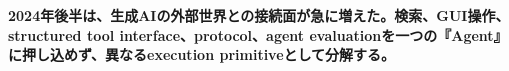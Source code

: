 \noindent\textbf{2024年後半は、生成AIの外部世界との接続面が急に増えた。検索、GUI操作、structured tool interface、protocol、agent evaluationを一つの『Agent』に押し込めず、異なるexecution primitiveとして分解する。}\autocite{src-6cafd8cf5668,src-9e4ef9c155b6}
